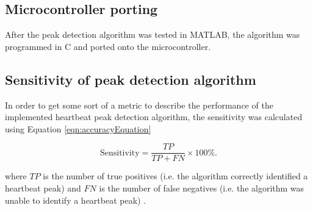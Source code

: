 \subsection{Microcontroller porting}
After the peak detection algorithm was tested in MATLAB, the algorithm was programmed in C and ported onto the microcontroller. 

\subsection{Sensitivity of peak detection algorithm}
In order to get some sort of a metric to describe the performance of the implemented heartbeat peak detection algorithm, the sensitivity was calculated using Equation \eqref{eqn:accuracyEquation}

\begin{equation}
	\label{eqn:accuracyEquation}
	\text{Sensitivity} = \frac{TP}{TP+FN} \times 100 \%.
\end{equation}

where $TP$ is the number of true positives (i.e. the algorithm correctly identified a heartbeat peak) and $FN$ is the number of false negatives (i.e. the algorithm was unable to identify a heartbeat peak) \cite{trevethan_sensitivity_2017}.












